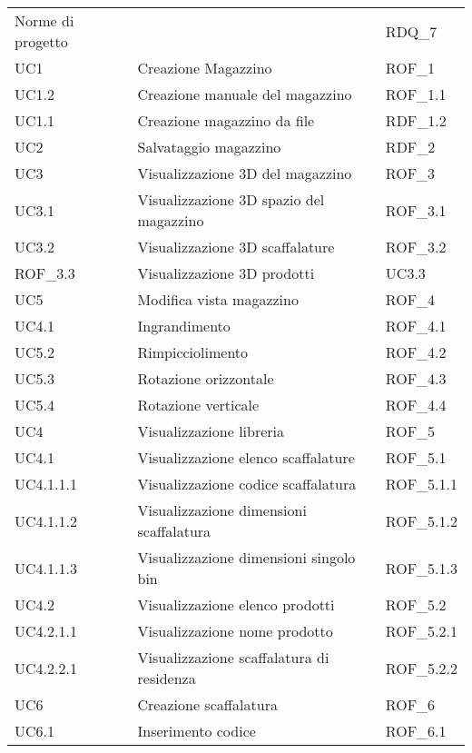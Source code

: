 \begin{xltabular}{\textwidth}{ p{0.3\textwidth} | X | p{0.2\textwidth} }
    Norme di progetto & & RDQ\_7\\


    UC1 & Creazione Magazzino & ROF\_1\\
    UC1.2 & Creazione manuale del magazzino & ROF\_1.1\\
    UC1.1 & Creazione magazzino da file & RDF\_1.2\\
    UC2 & Salvataggio magazzino & RDF\_2\\
    UC3 & Visualizzazione 3D del magazzino & ROF\_3\\
    UC3.1 & Visualizzazione 3D spazio del magazzino & ROF\_3.1\\
    UC3.2 & Visualizzazione 3D scaffalature & ROF\_3.2\\
    ROF\_3.3 & Visualizzazione 3D prodotti & UC3.3\\
    UC5 & Modifica vista magazzino & ROF\_4\\
    UC4.1 & Ingrandimento & ROF\_4.1\\ 
    UC5.2 & Rimpicciolimento & ROF\_4.2\\ 
    UC5.3 & Rotazione orizzontale & ROF\_4.3\\ 
    UC5.4 & Rotazione verticale & ROF\_4.4\\ 
    UC4 & Visualizzazione libreria & ROF\_5\\ 
    UC4.1 & Visualizzazione elenco scaffalature & ROF\_5.1\\ 
    UC4.1.1.1 & Visualizzazione codice scaffalatura & ROF\_5.1.1\\
    UC4.1.1.2 & Visualizzazione dimensioni scaffalatura & ROF\_5.1.2\\ 
    UC4.1.1.3 & Visualizzazione dimensioni singolo bin & ROF\_5.1.3\\ 
    UC4.2 & Visualizzazione elenco prodotti & ROF\_5.2\\ 
    UC4.2.1.1 & Visualizzazione nome prodotto & ROF\_5.2.1\\
    UC4.2.2.1 & Visualizzazione scaffalatura di residenza & ROF\_5.2.2\\ 
    UC6 & Creazione scaffalatura & ROF\_6\\
    UC6.1 & Inserimento codice & ROF\_6.1\\

\end{xltabular}
